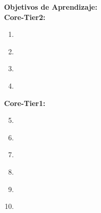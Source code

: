 \noindent \textbf{Objetivos de Aprendizaje:}\\
\noindent \textbf{Core-Tier2:}
\begin{enumerate}
	\setcounter{enumi}{0}
	\item \ALAlgorithmicStrategiesLODescribe\xspace[\ALAlgorithmicStrategiesLODescribeLevel]\label{sec:BOK:ALAlgorithmicStrategiesLODescribe}
	\item \ALAlgorithmicStrategiesLOUseATo\xspace[\ALAlgorithmicStrategiesLOUseAToLevel]\label{sec:BOK:ALAlgorithmicStrategiesLOUseATo}
	\item \ALAlgorithmicStrategiesLODescribeThe\xspace[\ALAlgorithmicStrategiesLODescribeTheLevel]\label{sec:BOK:ALAlgorithmicStrategiesLODescribeThe}
	\item \ALAlgorithmicStrategiesLODescribeHow\xspace[\ALAlgorithmicStrategiesLODescribeHowLevel]\label{sec:BOK:ALAlgorithmicStrategiesLODescribeHow}
\end{enumerate}
\noindent \textbf{Core-Tier1:}
\begin{enumerate}
	\setcounter{enumi}{4}
	\item \ALAlgorithmicStrategiesLOFor\xspace[\ALAlgorithmicStrategiesLOForLevel]\label{sec:BOK:ALAlgorithmicStrategiesLOFor}
	\item \ALAlgorithmicStrategiesLOUseA\xspace[\ALAlgorithmicStrategiesLOUseALevel]\label{sec:BOK:ALAlgorithmicStrategiesLOUseA}
	\item \ALAlgorithmicStrategiesLOUseAConquer\xspace[\ALAlgorithmicStrategiesLOUseAConquerLevel]\label{sec:BOK:ALAlgorithmicStrategiesLOUseAConquer}
	\item \ALAlgorithmicStrategiesLOUseRecursive\xspace[\ALAlgorithmicStrategiesLOUseRecursiveLevel]\label{sec:BOK:ALAlgorithmicStrategiesLOUseRecursive}
	\item \ALAlgorithmicStrategiesLOUseDynamic\xspace[\ALAlgorithmicStrategiesLOUseDynamicLevel]\label{sec:BOK:ALAlgorithmicStrategiesLOUseDynamic}
	\item \ALAlgorithmicStrategiesLODetermineAn\xspace[\ALAlgorithmicStrategiesLODetermineAnLevel]\label{sec:BOK:ALAlgorithmicStrategiesLODetermineAn}
\end{enumerate}


